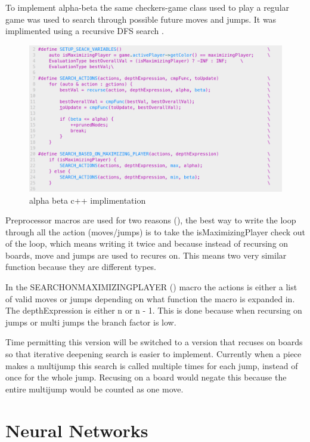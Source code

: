 \documentclass{article}
\begin{document}
To implement alpha-beta the same checkers-game class used to play a regular
game was used to search through possible future moves and jumps. It was implimented
using a recursive DFS search .

\begin{figure}
    \includegraphics[width=\linewidth]{images/alpha-beta-code.png}
    \caption{alpha beta c++ implimentation}
    \label{fig:ab-code}
\end{figure}

Preprocessor macros are used for two reasons (), the best way to write the loop
through all the action (moves/jumps) is to take the isMaximizingPlayer check
out of the loop, which means writing it twice and because instead of recursing
on boards, move and jumps are used to recures on. This means two very similar
function because they are different types.

In the SEARCH\textunderscore{}ON\textunderscore{}MAXIMIZING\textunderscore{}PLAYER ()
macro the actions is either a list of valid
moves or jumps depending on what function the macro is expanded in. The
depthExpression is either n or n - 1. This is done because when recursing on
jumps or multi jumps the branch factor is low.

Time permitting this version
will be switched to a version that recuses on boards so that iterative
deepening search is easier to implement. Currently when a piece makes a
multijump this search is called multiple times for each jump, instead of once
for the whole jump. Recusing on a board would negate this because the entire
multijump would be counted as one move.

\section{Neural Networks}
\end{document}
